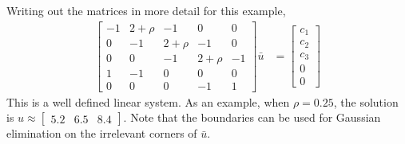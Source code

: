 \documentclass[11pt]{article}
\begin{document}
Writing out the matrices in more detail for this example,
\begin{align}
\begin{bmatrix}
	-1 & 2 + \rho & -1 & 0 & 0\\
	0 & -1 & 2+\rho & -1 & 0\\
	0 & 0 & -1 & 2+\rho & -1\\
	1 & -1 & 0 & 0 & 0\\
	0 & 0 & 0 & -1 & 1
\end{bmatrix} \bar{u} &= \begin{bmatrix} c_1 \\ c_2 \\ c_3 \\ 0 \\ 0\end{bmatrix}\label{eq:stacked-example-1}
\end{align}
This is a well defined linear system.  As an example, when $\rho = 0.25$, the solution is $u \approx \begin{bmatrix} 5.2 & 6.5 & 8.4\end{bmatrix}$.  Note that the boundaries can be used for Gaussian elimination on the irrelevant corners of $\bar{u}$.
\end{document}
